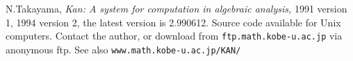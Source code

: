 
\begin{thebibliography}{ }

\bibitem[kan]
	N.Takayama,
	{\em Kan: A system for computation in
	algebraic analysis,} 1991 version 1,
        1994 version 2, the latest version is 2.990612.
	Source code available for Unix computers. 
         Contact the author, or download from 
	{\tt \small ftp.math.kobe-u.ac.jp} via anonymous ftp.
        See also {\tt \small www.math.kobe-u.ac.jp/KAN/}

\end{thebibliography}
